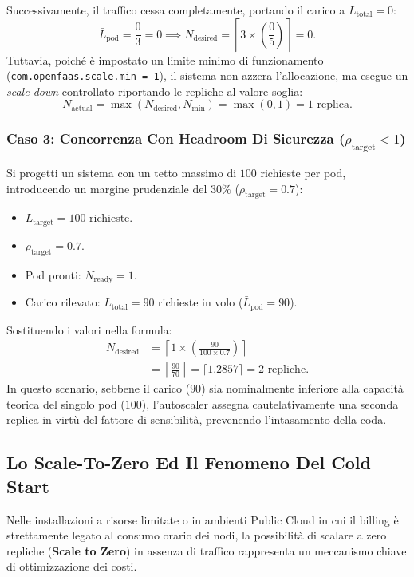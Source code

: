 \documentclass[11pt, a4paper]{article}
\begin{document}
Successivamente, il traffico cessa completamente, portando il carico a $L_{\text{total}} = 0$:
\begin{equation*}
    \bar{L}_{\text{pod}} = \frac{0}{3} = 0 \implies N_{\text{desired}} = \left\lceil 3 \times \left( \frac{0}{5} \right) \right\rceil = 0.
\end{equation*}
Tuttavia, poiché è impostato un limite minimo di funzionamento (\texttt{com.openfaas.scale.min = 1}), il sistema non azzera l'allocazione, ma esegue un \emph{scale-down} controllato riportando le repliche al valore soglia:
\begin{equation*}
    N_{\text{actual}} = \max(N_{\text{desired}}, N_{\text{min}}) = \max(0, 1) = 1\text{ replica}.
\end{equation*}

\subsubsection{Caso 3: Concorrenza Con Headroom Di Sicurezza ($\rho_{\text{target}} < 1$)}
Si progetti un sistema con un tetto massimo di $100$ richieste per pod, introducendo un margine prudenziale del $30\%$ ($\rho_{\text{target}} = 0.7$):
\begin{itemize}[noitemsep]
    \item $L_{\text{target}} = 100$ richieste.
    \item $\rho_{\text{target}} = 0.7$.
    \item Pod pronti: $N_{\text{ready}} = 1$.
    \item Carico rilevato: $L_{\text{total}} = 90$ richieste in volo ($\bar{L}_{\text{pod}} = 90$).
\end{itemize}

Sostituendo i valori nella formula:
\begin{align*}
    N_{\text{desired}} &= \left\lceil 1 \times \left( \frac{90}{100 \times 0.7} \right) \right\rceil \\
    &= \left\lceil \frac{90}{70} \right\rceil = \lceil 1.2857 \rceil = 2\text{ repliche}.
\end{align*}
In questo scenario, sebbene il carico ($90$) sia nominalmente inferiore alla capacità teorica del singolo pod ($100$), l'autoscaler assegna cautelativamente una seconda replica in virtù del fattore di sensibilità, prevenendo l'intasamento della coda.

\subsection{Lo Scale-To-Zero Ed Il Fenomeno Del Cold Start}
Nelle installazioni a risorse limitate o in ambienti Public Cloud in cui il billing è strettamente legato al consumo orario dei nodi, la possibilità di scalare a zero repliche (\textbf{Scale to Zero}) in assenza di traffico rappresenta un meccanismo chiave di ottimizzazione dei costi.
\end{document}
